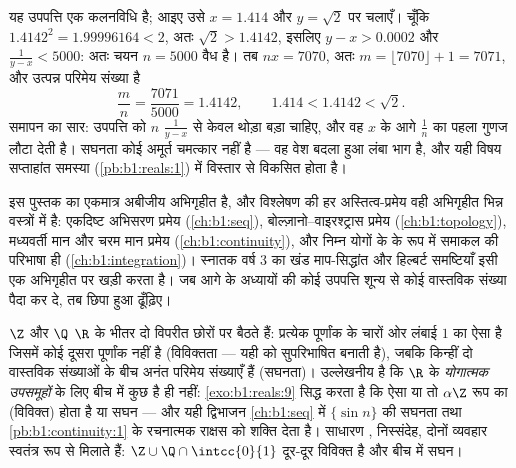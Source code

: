 \begin{example}\label{ex:b1:reals:densityrun}
यह उपपत्ति एक कलनविधि है; आइए उसे $x = 1.414$ और $y = \sqrt 2$ पर चलाएँ।
चूँकि $1.4142^2 = 1.99996164 < 2$, अतः $\sqrt 2 > 1.4142$, इसलिए $y - x >
0.0002$ और $\frac{1}{y - x} < 5000$: अतः चयन $n = 5000$ वैध है। तब $nx =
7070$, अतः $m = \lfloor 7070 \rfloor + 1 = 7071$, और उत्पन्न परिमेय संख्या
है
\[
\frac{m}{n} = \frac{7071}{5000} = 1.4142,
\qquad
1.414 < 1.4142 < \sqrt 2 .
\]
समापन का सार: उपपत्ति को $n$ $\frac{1}{y-x}$ से केवल थोड़ा बड़ा चाहिए, और वह
$x$ के आगे $\frac 1n$ का पहला गुणज लौटा देती है। सघनता कोई अमूर्त चमत्कार
नहीं है --- वह वेश बदला हुआ लंबा भाग है, और यही विषय सप्ताहांत समस्या
(\cref{pb:b1:reals:1}) में विस्तार से विकसित होता है।
\end{example}

\begin{remark}[पूर्णता का अगला प्रयोग कहाँ]
 इस पुस्तक का एकमात्र अबीजीय अभिगृहीत है, और विश्लेषण
की हर अस्तित्व-प्रमेय वही अभिगृहीत भिन्न वस्त्रों में है: एकदिष्ट अभिसरण
प्रमेय (\cref{ch:b1:seq}), बोल्ज़ानो--वाइरश्ट्रास प्रमेय
(\cref{ch:b1:topology}), मध्यवर्ती मान और चरम मान प्रमेय
(\cref{ch:b1:continuity}), और निम्न योगों के  के रूप में समाकल की
परिभाषा ही (\cref{ch:b1:integration})। स्नातक वर्ष 3 का खंड माप-सिद्धांत और
हिल्बर्ट समष्टियाँ इसी एक अभिगृहीत पर खड़ी करता है। जब आगे के अध्यायों की
कोई उपपत्ति शून्य से कोई वास्तविक संख्या पैदा कर दे, तब छिपा हुआ 
ढूँढ़िए।
\end{remark}

\begin{remark}[विविक्तता और सघनता के बीच]
$\Z$ और $\Q$ $\R$ के भीतर दो विपरीत छोरों पर बैठते हैं: प्रत्येक पूर्णांक के
चारों ओर लंबाई $1$ का ऐसा  है जिसमें कोई दूसरा पूर्णांक नहीं है
(विविक्तता --- यही  को सुपरिभाषित बनाती है), जबकि किन्हीं दो वास्तविक
संख्याओं के बीच अनंत परिमेय संख्याएँ हैं (सघनता)। उल्लेखनीय है कि $\R$ के
\emph{योगात्मक उपसमूहों} के लिए बीच में कुछ है ही नहीं:
\cref{exo:b1:reals:9} सिद्ध करता है कि ऐसा  या तो $\alpha\Z$ रूप का
(विविक्त) होता है या सघन --- और यही द्विभाजन \cref{ch:b1:seq} में $\{\sin
n\}$ की सघनता तथा \cref{pb:b1:continuity:1} के रचनात्मक राक्षस को शक्ति देता
है। साधारण , निस्संदेह, दोनों व्यवहार स्वतंत्र रूप से मिलाते हैं: $\Z
\cup \Q\cap\intcc{0}{1}$ दूर-दूर विविक्त है और बीच में सघन।
\end{remark}

